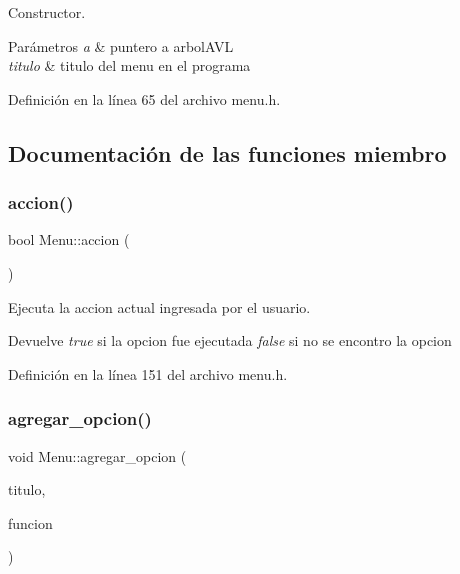 Constructor. 


\begin{DoxyParams}{Parámetros}
{\em a} & puntero a arbol\+A\+VL \\
\hline
{\em titulo} & titulo del menu en el programa \\
\hline
\end{DoxyParams}


Definición en la línea 65 del archivo menu.\+h.



\subsection{Documentación de las funciones miembro}
\mbox{\label{classMenu_ab5609ebe5415d2e5f06143819b832981}} 
\subsubsection{\texorpdfstring{accion()}{accion()}}
{\footnotesize\ttfamily bool Menu\+::accion (\begin{DoxyParamCaption}{ }\end{DoxyParamCaption})\hspace{0.3cm}{\ttfamily [inline]}}



Ejecuta la accion actual ingresada por el usuario. 

\begin{DoxyReturn}{Devuelve}
{\itshape true} si la opcion fue ejecutada {\itshape false} si no se encontro la opcion 
\end{DoxyReturn}


Definición en la línea 151 del archivo menu.\+h.

\mbox{\label{classMenu_a1e1f674058f3fd03a500859abda7dded}} 
\subsubsection{\texorpdfstring{agregar\+\_\+opcion()}{agregar\_opcion()}}
{\footnotesize\ttfamily void Menu\+::agregar\+\_\+opcion (\begin{DoxyParamCaption}\item[{std\+::string}]{titulo,  }\item[{std\+::function$<$ bool(\hyperlink{classArbolAVL}{Arbol\+A\+VL} $\ast$a)$>$ $\ast$}]{funcion }\end{DoxyParamCaption})\hspace{0.3cm}{\ttfamily [inline]}}



